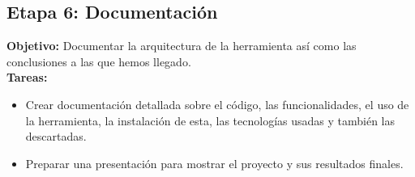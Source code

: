 \subsection{Etapa 6: Documentación}
\label{subsec:6}
\textbf{Objetivo:} Documentar la arquitectura de la herramienta así como las conclusiones a las que hemos llegado.\\


\textbf{Tareas:}
\begin{itemize}
    \item Crear documentación detallada sobre el código, las funcionalidades, el uso de la herramienta, la instalación de esta, las tecnologías usadas y también las descartadas.
    \item Preparar una presentación para mostrar el proyecto y sus resultados finales.
\end{itemize}






